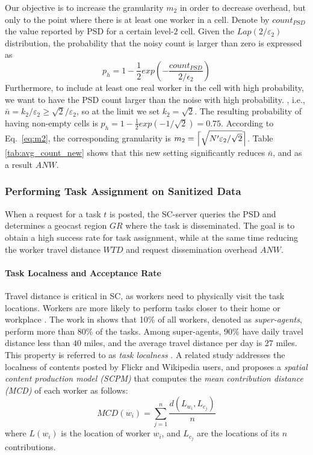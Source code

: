 \documentclass{USC-Thesis}
\DeclarePairedDelimiter{\ceil}{\lceil}{\rceil}
\numberwithin{equation}{chapter}
\begin{document}
Our objective is to increase the granularity $m_2$ in order to decrease overhead, but only to the point where there is at least one worker in a cell. Denote by $count_{PSD}$ the value reported by PSD for a certain level-$2$ cell. Given the $Lap(2/\varepsilon_2)$ distribution, the probability that the noisy count is larger than zero is expressed as
$$p_h=1-\frac{1}{2}exp(-\frac{count_{PSD}}{2/\epsilon_2})$$
Furthermore, to include at least one real worker in the cell with high probability, we want to have the PSD count larger than the noise with high probability. , i.e., $\bar{n}=k_2/\varepsilon_2\ge \sqrt{2}/\varepsilon_2$, so at the limit we set $k_2=\sqrt{2}$. The resulting probability of having non-empty cells is $p_h=1-\frac{1}{2}exp(-1/\sqrt{2})=0.75$.
According to Eq.~\eqref{eq:m2}, the corresponding granularity is $m_2=\ceil[\Big]{\sqrt{N'\varepsilon_2/\sqrt{2}}}$. Table \ref{tab:avg_count_new} shows that this new setting significantly reduces $\bar{n}$, and as a result $\mathit{ANW}$.


\subsubsection{Performing Task Assignment on Sanitized Data}
\label{sec:geocast}

When a request for a task $t$ is posted, the SC-server queries the PSD and determines a geocast region $\mathit{GR}$ where the task is disseminated. The goal is to obtain a high success rate for task assignment, while at the same time reducing the worker travel distance $\mathit{WTD}$ and request dissemination overhead $\mathit{ANW}$.

\paragraph{Task Localness and Acceptance Rate}
\label{sec:acceptance_rate}

Travel distance is critical in SC, as workers need to physically visit the task locations. Workers are more likely to perform tasks closer to their home or workplace \cite{musthag2013labor,kazemi2012geocrowd,alt2010location}. The work in \cite{musthag2013labor} shows that 10\% of all workers, denoted as {\em super-agents}, perform more than 80\% of the tasks. Among super-agents, 90\% have daily travel distance less than $40$ miles, and the average travel distance per day is $27$ miles. This property is referred to as \textit{task localness} \cite{kazemi2012geocrowd}. A related study \cite{hecht2010localness} addresses the localness of contents posted by Flickr and Wikipedia users, and proposes a {\em spatial content production model (SCPM)} that computes the \textit{mean contribution distance (MCD)} of each worker as follows:
\begin{equation}
\label{eq:mcd}
MCD(w_i) = \displaystyle \sum\limits_{j=1}^{n}\frac{d(L_{w_i},L_{c_j})}{n}
\end{equation}
where $L(w_i)$ is the location of worker $w_i$, and $L_{c_j}$ are the locations of its $n$ contributions.
\end{document}
